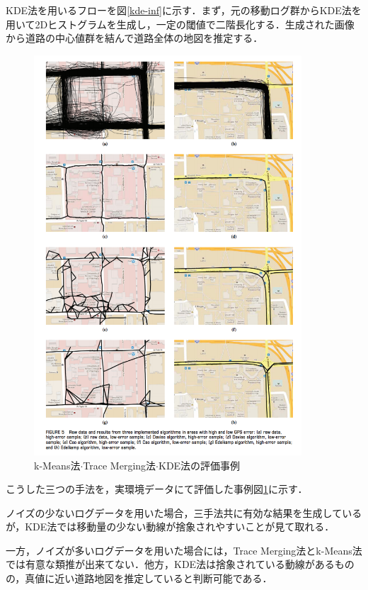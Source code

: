\begin{itemize}
	      KDE法を用いるフローを図\ref{kde-inf}に示す．まず，元の移動ログ群からKDE法を用いて2Dヒストグラムを生成し，一定の閾値で二階長化する．生成された画像から道路の中心値群を結んで道路全体の地図を推定する．
	         	      	          
\end{itemize}

\begin{figure}[htb]
    \centering
    \includegraphics[width=10cm]{fig/inf-eval.png}
    \caption{k-Means法$\cdot$Trace Merging法$\cdot$KDE法の評価事例 \protect \footnotemark}
    \label{inf-eval}
\end{figure}
こうした三つの手法を，実環境データにて評価した事例図\ref{inf-eval}に示す． 
                                            
ノイズの少ないログデータを用いた場合，三手法共に有効な結果を生成しているが，KDE法では移動量の少ない動線が捨象されやすいことが見て取れる．
                                        
一方，ノイズが多いログデータを用いた場合には，Trace Merging法とk-Means法では有意な類推が出来てない．他方，KDE法は捨象されている動線があるものの，真値に近い道路地図を推定していると判断可能である．
                                        
